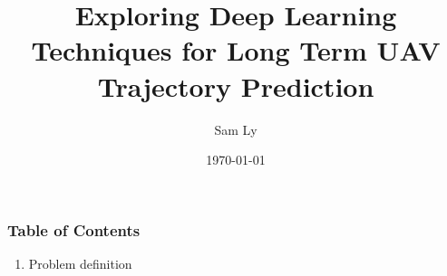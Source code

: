 \documentclass{beamer}
\title{
    Exploring Deep Learning Techniques for Long Term UAV Trajectory Prediction
}
\author{Sam Ly}
\institute{Cal Poly Pomona}
\date{\today}
\begin{document}
\begin{frame}
    \titlepage
\end{frame}

\begin{frame}
    \frametitle{Table of Contents}

    \begin{enumerate}
        \item Problem definition

    \end{enumerate}
\end{frame}
\end{document}
